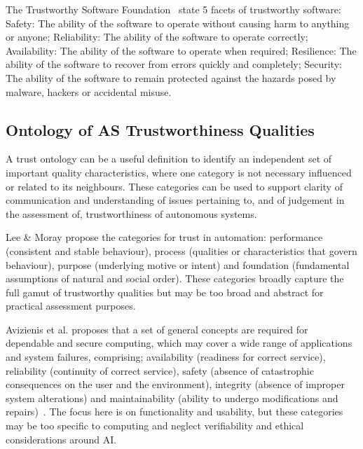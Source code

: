 The Trustworthy Software Foundation~\cite{ts_foundation} state 5 facets of trustworthy software: Safety: The ability of the software to operate without causing harm to anything or anyone; Reliability: The ability of the software to operate correctly; Availability: The ability of the software to operate when required; Resilience: The ability of the software to recover from errors quickly and completely; Security: The ability of the software to remain protected against the hazards posed by malware, hackers or accidental misuse.



\subsection{Ontology of AS Trustworthiness Qualities}\label{sec:tasq-ont}

A trust ontology can be a useful definition to identify an independent set of important quality characteristics, where one category is not necessary influenced or related to its neighbours. These categories can be used to support clarity of communication and understanding of issues pertaining to, and of judgement in the assessment of, trustworthiness of autonomous systems. 

Lee \& Moray propose the categories for trust in automation: performance (consistent and stable behaviour), process (qualities or characteristics that govern behaviour), purpose (underlying motive or intent) and foundation (fundamental assumptions of natural and social order). These categories broadly capture the full gamut of trustworthy qualities but may be too broad and abstract for practical assessment purposes. 

Avizienis et al. proposes that a set of general concepts are required for dependable and secure computing, which may cover a wide range of applications and system failures, comprising; availability (readiness for correct service), reliability (continuity of correct service), safety (absence of catastrophic consequences on the user and the environment), integrity (absence of improper system alterations) and maintainability (ability to undergo modifications and repairs)~\cite{avizienis2004basic}. The focus here is on functionality and usability, but these categories may be too specific to computing and neglect verifiability and ethical considerations around AI.

